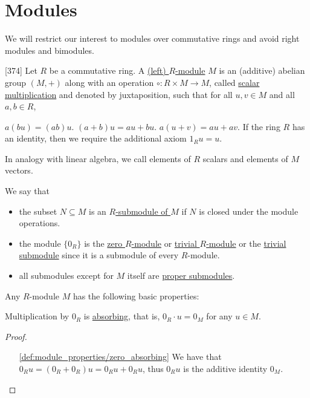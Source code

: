 \section{Modules}\label{sec:modules}

\begin{note}\label{note:module_over_commutative_ring}
  We will restrict our interest to modules over commutative rings and avoid right modules and bimodules.
\end{note}

\begin{definition}\label{def:module}\cite{Knapp2016BAlg}[374]
  Let $R$ be a commutative ring. A \ul{(left) $R$-module} $M$ is an (additive) abelian group $(M, +)$ along with an operation $\circ: R \times M \to M$, called \ul{scalar multiplication} and denoted by juxtaposition, such that for all $u, v \in M$ and all $a, b \in R$,
  \begin{description}
     $a (b u) = (a b) u$.
     $(a + b) u = a u + b u$.
     $a (u + v) = a u + a v$.
     If the ring $R$ has an identity, then we require the additional axiom $1_R u = u$.
  \end{description}

  In analogy with linear algebra, we call elements of $R$ scalars and elements of $M$ vectors.

  We say that
  \begin{itemize}
    \item the subset $N \subseteq M$ is an \ul{$R$-submodule of $M$} if $N$ is closed under the module operations.
    \item the module $\{ 0_R \}$ is the \ul{zero $R$-module} or \ul{trivial $R$-module} or the \ul{trivial submodule} since it is a submodule of every $R$-module.
    \item all submodules except for $M$ itself are \ul{proper submodules}.
  \end{itemize}
\end{definition}

\begin{proposition}\label{def:module_properties}
  Any $R$-module $M$ has the following basic properties:
  \begin{defenum}
    \item\label{def:module_properties/zero_absorbing} Multiplication by $0_R$ is \ul{absorbing}, that is, $0_R \cdot u = 0_M$ for any $u \in M$.
  \end{defenum}
\end{proposition}
\begin{proof}\mbox{}
  \begin{itemize}
    \item[\ref{def:module_properties/zero_absorbing}] We have that $0_R u = (0_R + 0_R)u = 0_R u + 0_R u$, thus $0_R u$ is the additive identity $0_M$.
  \end{itemize}
\end{proof}

